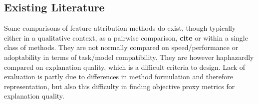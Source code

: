 \documentclass[main]{subfiles}
\begin{document}
\subsection*{Existing Literature}

Some comparisons of feature attribution methods do exist, though typically either in a qualitative context, as a pairwise comparison, \textbf{cite} or within a single class of methods. They are not normally compared on speed/performance or adoptability in terms of task/model compatibility. They are however haphazardly compared on explanation quality, which is a difficult criteria to design. Lack of evaluation is partly due to differences in method formulation and therefore representation, but also this difficulty in finding objective proxy metrics for explanation quality.  





\end{document}
